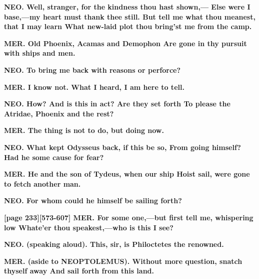 \documentclass[11pt,letter]{book}
\begin{document}
\par \textbf{NEO. Well, stranger, for the kindness thou hast shown,— Else were I base,—my heart must thank thee still. But tell me what thou meanest, that I may learn What new-laid plot thou bring’st me from the camp.}
\par 

\par \textbf{MER. Old Phoenix, Acamas and Demophon Are gone in thy pursuit with ships and men.}
\par 

\par \textbf{NEO. To bring me back with reasons or perforce?}
\par 

\par \textbf{MER. I know not. What I heard, I am here to tell.}
\par 

\par \textbf{NEO. How? And is this in act? Are they set forth To please the Atridae, Phoenix and the rest?}
\par 

\par \textbf{MER. The thing is not to do, but doing now.}
\par 

\par \textbf{NEO. What kept Odysseus back, if this be so, From going himself? Had he some cause for fear?}
\par 

\par \textbf{MER. He and the son of Tydeus, when our ship Hoist sail, were gone to fetch another man.}
\par 

\par \textbf{NEO. For whom could he himself be sailing forth?}
\par 

\par \textbf{[page 233][573-607] MER. For some one,—but first tell me, whispering low Whate’er thou speakest,—who is this I see?}
\par 

\par \textbf{NEO. (speaking aloud). This, sir, is Philoctetes the renowned.}
\par 

\par \textbf{MER. (aside to NEOPTOLEMUS). Without more question, snatch thyself away And sail forth from this land.}
\par 
\end{document}
